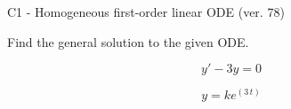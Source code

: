 \begin{exercise}
  \begin{exerciseTitle}C1 - Homogeneous first-order linear ODE (ver. 78)\end{exerciseTitle}
  \begin{exerciseStatement}
    
Find the general solution to the given ODE.

    
\[y'-3y=0\]

  \end{exerciseStatement}
  \begin{exerciseAnswer}
    
\[y= k e^{\left(3 \, t\right)}\]

  \end{exerciseAnswer}
\end{exercise}